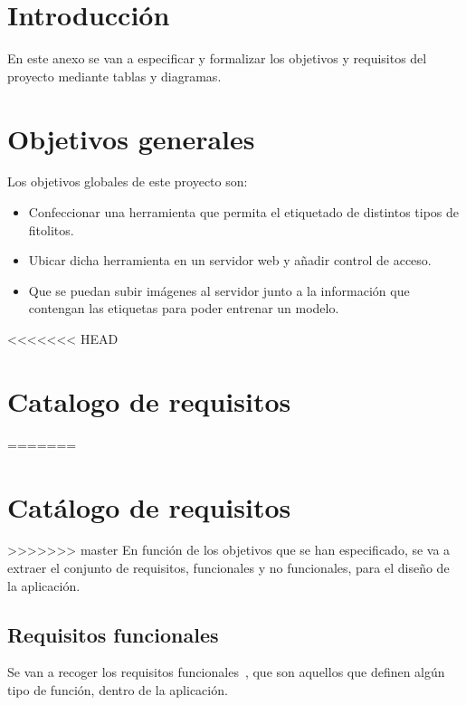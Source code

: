 
\section{Introducción}
En este anexo se van a especificar y formalizar los objetivos y requisitos del proyecto mediante tablas y diagramas.

\section{Objetivos generales}
Los objetivos globales de este proyecto son:
\begin{itemize}
	\item Confeccionar una herramienta que permita el etiquetado de distintos tipos de fitolitos.
	
	\item Ubicar dicha herramienta en un servidor web y añadir control de acceso.
	
	\item Que se puedan subir imágenes al servidor junto a la información que contengan las etiquetas para poder entrenar un modelo.

\end{itemize}
<<<<<<< HEAD
\section{Catalogo de requisitos}
=======
\section{Catálogo de requisitos}
>>>>>>> master
En función de los objetivos que se han especificado, se va a extraer el conjunto de requisitos, funcionales y no funcionales, para el diseño de la aplicación.

\subsection{Requisitos funcionales}
Se van a recoger los requisitos funcionales~\cite{fun}, que son aquellos que definen algún tipo de función, dentro de la aplicación.

